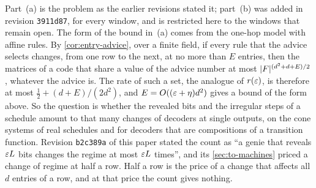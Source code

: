 Part~(a) is the problem as the earlier revisions stated it; part~(b) was added in revision \texttt{3911d87}, for
every window, and is restricted here to the windows that remain open. The form of the bound
in~(a) comes from the one-hop model with affine rules. By \cref{cor:entry-advice}, over a finite field, if every rule
that the advice selects changes, from one row to the next, at no more than $E$ entries, then the matrices of a code
that share a value of the advice number at most $\lvert F \rvert^{(d^2+d+E)/2}$, whatever the advice is. The rate of such a
set, the analogue of $r(\varepsilon)$, is therefore at most $\tfrac12+(d+E)/(2d^2)$, and $E=O((\varepsilon+\eta)d^2)$ gives a bound
of the form above. So the question is whether the revealed bits and the irregular steps of a schedule amount to that
many changes of decoders at single outputs, on the cone systems of real schedules and for decoders that are
compositions of a transition function. Revision \texttt{b2c389a} of this paper stated the count as ``a genie that
reveals $\varepsilon L$ bits changes the regime at most $\varepsilon L$ times'', and its \cref{sec:to-machines} priced a change of
regime at half a row. Half a row is the price of a change that affects all $d$ entries of a row, and at that price the
count gives nothing.

